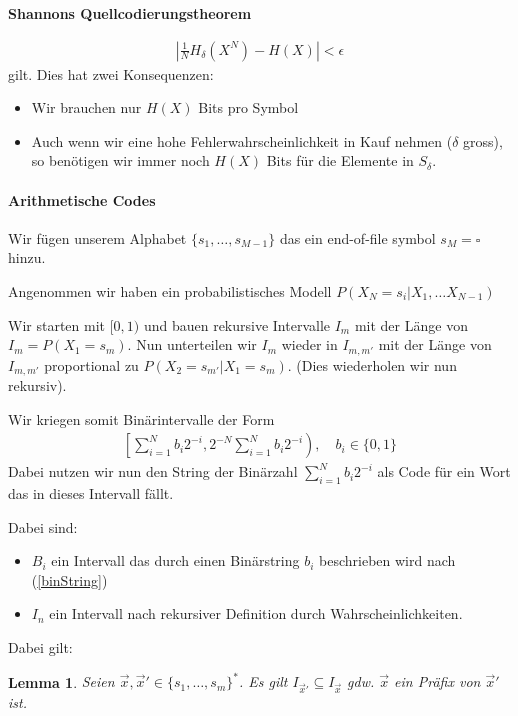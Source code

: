 \documentclass[25pt]{sciposter}
\newtheorem*{lem}{Lemma}
\newenvironment{thm}[1]{\begin{mdframed}[nobreak=true,backgroundcolor=Emerald!10,innertopmargin=15pt, innerbottommargin=15pt]
		\textbf{#1 }
	}
	{ 
	\end{mdframed}
}
\begin{document}
\begin{multicols}{3}
\begin{thm}{Shannons Quellcodierungstheorem}
	\begin{align*}
\left|\frac{1}{N} H_{\delta} (X^N) - H(X) \right| < \epsilon
	\end{align*}
gilt. Dies hat zwei Konsequenzen:

\begin{itemize}
	\item Wir brauchen nur $H(X)$ Bits pro Symbol
	\item Auch wenn wir eine hohe Fehlerwahrscheinlichkeit in Kauf nehmen ($\delta$ gross), so benötigen wir immer noch $H(X)$ Bits für die Elemente in $S_\delta$.
\end{itemize}

\end{thm}


\paragraph{Arithmetische Codes}
Wir fügen unserem Alphabet $\{s_1,\ldots ,s_{M-1}\}$ das ein end-of-file symbol $s_M = \square$ hinzu.

Angenommen wir haben ein probabilistisches Modell $P(X_N = s_i | X_1, \ldots X_{N-1})$ 

Wir starten mit $[0,1)$ und bauen rekursive Intervalle $I_m$ mit der Länge von $I_m = P(X_1 = s_m)$. Nun unterteilen wir $I_m$ wieder in $I_{m,m'}$ mit der Länge von $I_{m,m'}$ proportional zu $P(X_2 = s_{m'} | X_1 = s_m)$. (Dies wiederholen wir nun rekursiv).

Wir kriegen somit Binärintervalle der Form 
\begin{align} \label{binString}
	\left[ \sum_{i=1}^{N} b_i 2^{-i},2^{-N} \sum_{i=1}^{N} b_i 2^{-i} \right), \quad b_i \in \{0,1\}
\end{align}
Dabei nutzen wir nun den String der Binärzahl $ \sum_{i=1}^{N} b_i 2^{-i}$ als Code für ein Wort das in dieses Intervall fällt.


Dabei sind:

\begin{itemize}
	\item $B_i$ ein Intervall das durch einen Binärstring $b_i$ beschrieben wird nach (\ref{binString})
	\item $I_n$ ein Intervall nach rekursiver Definition durch Wahrscheinlichkeiten.
\end{itemize}


Dabei gilt:


\begin{lem}
	Seien $\vec{x}, \vec{x}' \in \{s_1,\ldots,s_m\}^*$. Es gilt $I_{\vec{x}'} \subseteq I_{\vec{x}}$ gdw. $\vec{x}$ ein Präfix von $\vec{x}'$ ist.
\end{lem}


\end{multicols}
\end{document}

